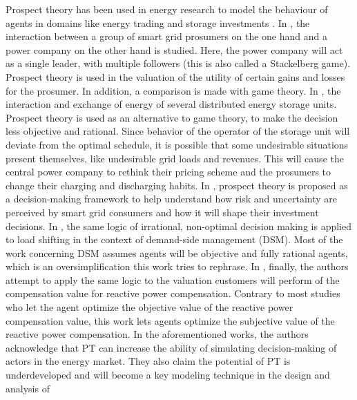 \newline \newline \noindent
Prospect theory has been used in energy research to model the behaviour of agents in domains like energy trading and storage investments \cite{Stackelbergprospect,Storageprospect,consumercentric,loadshift,reactive}. In \cite{Stackelbergprospect}, the interaction between a group of smart grid prosumers on the one hand and a power company on the other hand is studied. Here, the power company will act as a single leader, with multiple followers (this is also called a Stackelberg game). Prospect theory is used in the valuation of the utility of certain gains and losses for the prosumer. In addition, a comparison is made with game theory. In \cite{Storageprospect}, the interaction and exchange of energy of several distributed energy storage units. Prospect theory is used as an alternative to game theory, to make the decision less objective and rational. Since behavior of the operator of the storage unit will deviate from the optimal schedule, it is possible that some undesirable situations present themselves, like undesirable grid loads and revenues. This will cause the central power company to rethink their pricing scheme and the prosumers to change their charging and discharging habits. In \cite{consumercentric}, prospect theory is proposed as a decision-making framework to help understand how risk and uncertainty are perceived by smart grid consumers and how it will shape their investment decisions. In \cite{loadshift}, the same logic of irrational, non-optimal decision making is applied to load shifting in the context of demand-side management (DSM). Most of the work concerning DSM assumes agents will be objective and fully rational agents, which is an oversimplification this work tries to rephrase. In \cite{reactive}, finally, the authors attempt to apply the same logic to the valuation customers will perform of the compensation value for reactive power compensation. Contrary to most studies who let the agent optimize the objective value of the reactive power compensation value, this work lets agents optimize the subjective value of the reactive power compensation.  In the aforementioned works, the authors acknowledge that PT can increase the ability of simulating decision-making of actors in the energy market. They also claim the potential of PT is underdeveloped and will become a key modeling technique in the design and analysis of 